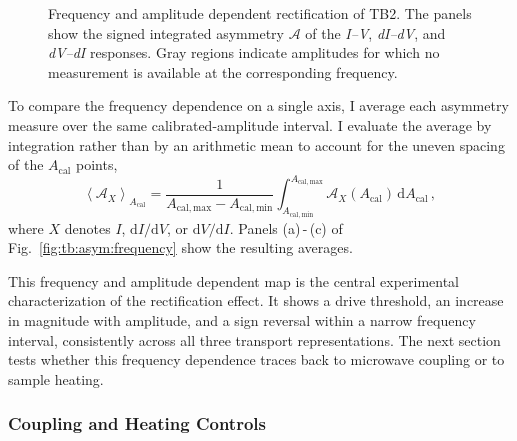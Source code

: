         \begin{figure}[t]
            \centering
            \hfill
            \hfill
            \caption{
                Frequency and amplitude dependent rectification of TB2. The panels show the signed integrated asymmetry $\mathcal{A}$ of the \textit{I--V}, \textit{dI--dV}, and \textit{dV--dI} responses. Gray regions indicate amplitudes for which no measurement is available at the corresponding frequency.
                }
            \label{fig:tb:asym:rectification-map}
        \end{figure}
        
        To compare the frequency dependence on a single axis, I average each asymmetry measure over the same calibrated-amplitude interval. I evaluate the average by integration rather than by an arithmetic mean to account for the uneven spacing of the $A_\mathrm{cal}$ points,
        \begin{equation}
            \left\langle\mathcal{A}_X\right\rangle_{A_\mathrm{cal}}=\frac{1}{A_\mathrm{cal,max}-A_\mathrm{cal,min}}\int_{A_\mathrm{cal,min}}^{A_\mathrm{cal,max}}\mathcal{A}_X(A_\mathrm{cal})\,\mathrm{d}A_\mathrm{cal}\,,
            \label{eq:tb:asym:amplitude-averaged-rectification}
        \end{equation}
        where $X$ denotes $I$, $\mathrm{d}I/\mathrm{d}V$, or $\mathrm{d}V/\mathrm{d}I$. Panels (a)\,-\,(c) of Fig.~\ref{fig:tb:asym:frequency} show the resulting averages.

        This frequency and amplitude dependent map is the central experimental characterization of the rectification effect. It shows a drive threshold, an increase in magnitude with amplitude, and a sign reversal within a narrow frequency interval, consistently across all three transport representations. The next section tests whether this frequency dependence traces back to microwave coupling or to sample heating.

    \subsubsection*{Coupling and Heating Controls}
    \label{subsec:tb:asym:controls}


